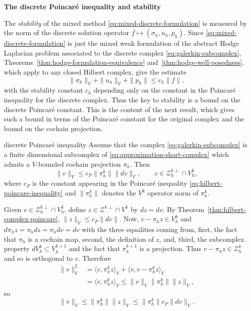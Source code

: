 \medskip\noindent\textbf{{The discrete Poincaré inequality and stability}}\par
{The \emph{stability} of the mixed method \eqref{eq:mixed-discrete-formulation} is measured by the norm of the discrete solution operator $f\mapsto(\sigma_h,u_h,p_h)$. Since \eqref{eq:mixed-discrete-formulation} is just the mixed weak formulation of the abstract Hodge Laplacian problem associated to the discrete complex \eqref{eq:galerkin-subcomplex}, Theorems~\ref{thm:hodge-formulation-equivalence} and~\ref{thm:hodge-well-posedness}, which apply to any closed Hilbert complex, give the estimate}
\begin{equation}\label{eq:discrete-mixed-stability}
\|\sigma_h\|_V+\|u_h\|_V+\|p_h\|\leq c_h\|f\|,
\end{equation}
{with the stability constant $c_h$ depending only on the constant in the Poincaré inequality for the discrete complex. Thus the key to stability is a bound on the discrete Poincaré constant. This is the content of the next result, which gives such a bound in terms of the Poincaré constant for the original complex and the bound on the cochain projection.}

\begin{Theorem}{{discrete Poincaré inequality}}\label{thm:discrete-poincare}
{Assume that the complex \eqref{eq:galerkin-subcomplex} is a finite dimensional subcomplex of \eqref{eq:approximation-short-complex} which admits a $V$-bounded cochain projection $\pi_h$. Then}
\[
\|v\|_V\leq c_P\|\pi_h^k\|\|dv\|_V,\qquad v\in\mathcal Z_h^{k\perp}\cap V_h^k,
\]
{where $c_P$ is the constant appearing in the Poincaré inequality \eqref{eq:hilbert-poincare-inequality} and $\|\pi_h^k\|$ denotes the $V^k$ operator norm of $\pi_h^k$.}
\end{Theorem}

\begin{Proof}
{Given $v\in\mathcal Z_h^{k\perp}\cap V_h^k$, define $z\in\mathcal Z^{k\perp}\cap V^k$ by $dz=dv$. By Theorem~\ref{thm:hilbert-complex-poincare}, $\|z\|_V\leq c_P\|dv\|$. Now, $v-\pi_hz\in V_h^k$ and $d\pi_hz=\pi_hdz=\pi_hdv=dv$ with the three equalities coming from, first, the fact that $\pi_h$ is a cochain map, second, the definition of $z$, and, third, the subcomplex property $dV_h^k\subset V_h^{k+1}$ and the fact that $\pi_h^{k+1}$ is a projection. Thus $v-\pi_hz\in\mathcal Z_h^k$ and so is orthogonal to $v$. Therefore}
\[
\begin{aligned}
\|v\|_V^2&=\langle v,\pi_h^kz\rangle_V+\langle v,v-\pi_h^kz\rangle_V\\
&=\langle v,\pi_h^kz\rangle_V\leq\|v\|_V\|\pi_h^k\|\|z\|_V,
\end{aligned}
\]
{so}
\[
\|v\|_V\leq\|\pi_h^k\|\|z\|_V\leq\|\pi_h^k\|c_P\|dv\|_V.
\]
\end{Proof}

